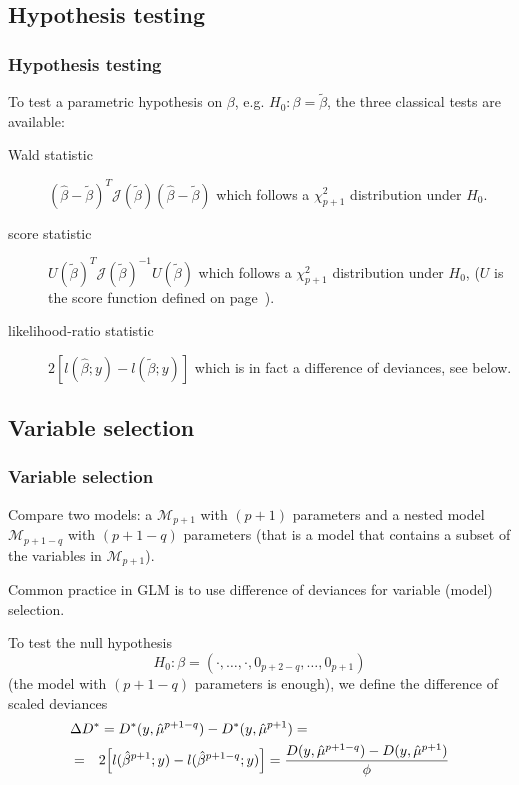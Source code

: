\documentclass{beamer}
\newcommand{\bs}{\bigskip}
\begin{document}
\subsection{Hypothesis testing}
\begin{frame}
\frametitle{Hypothesis testing}
To test a parametric hypothesis on $\beta$, e.g. $H_0:
\beta=\tilde{\beta}$, the three classical tests are available:

\begin{description}
\item[Wald statistic] $(\hat{\beta} -\tilde{\beta})^T {\mathcal J}(\tilde{\beta})
  (\hat{\beta} -\tilde{\beta})$ which follows a $\chi^2_{p+1}$
  distribution under $H_0$.
\item[score statistic] $U(\tilde{\beta})^T {\mathcal
J(\tilde{\beta})}^{-1}U(\tilde{\beta})$ which follows a 
  $\chi^2_{p+1}$ distribution under $H_0$, ($U$ is the score function defined on
  page~\pageref{Ufct}).
\item[likelihood-ratio statistic] $2
  [l(\hat{\beta};y)-l(\tilde{\beta};y)]$ which is in fact a difference
  of deviances, see below.
\end{description}
\end{frame}

\subsection{Variable selection}
\begin{frame}
\frametitle{Variable selection}

Compare two models: a ${\mathcal M}_{p+1}$ with $(p+1)$
parameters and a {\color{blue} nested} model ${\mathcal M}_{p+1-q}$
with $(p+1-q)$ parameters (that is a model that contains a subset of the
variables in ${\mathcal M}_{p+1}$).

\bs
Common practice in GLM is to use difference of deviances for
variable (model) selection.

\bs
To test the null hypothesis
$$H_0: \beta = (\cdot, \ldots, \cdot, 0_{p+2-q},\ldots,0_{p+1})$$
(the model with $(p+1-q)$ parameters is enough), we
define the difference of scaled deviances
\begin{eqnarray*}
  \lefteqn{\Delta D^* = D^*(y,\hat{\mu}^{p+1-q}) - D^*(y,\hat{\mu}^{p+1}) = }\\ 
& = & 2 \Big[ l(\hat{\beta}^{p+1};y) - l(\hat{\beta}^{p+1-q};y)\Big] = \frac{D(y,\hat{\mu}^{p+1-q}) - D(y,\hat{\mu}^{p+1})}{\phi}
\end{eqnarray*}

\end{frame}
\end{document}

